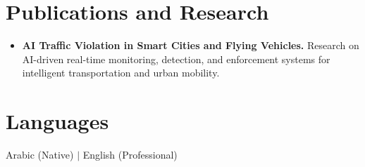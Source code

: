 \documentclass[10pt,letterpaper]{article}
\begin{document}
\section{Publications and Research}
\begin{itemize}
\item \textbf{AI Traffic Violation in Smart Cities and Flying Vehicles.} Research on AI-driven real-time monitoring, detection, and enforcement systems for intelligent transportation and urban mobility.
\end{itemize}

\section{Languages}
Arabic (Native) $|$ English (Professional)
\end{document}
